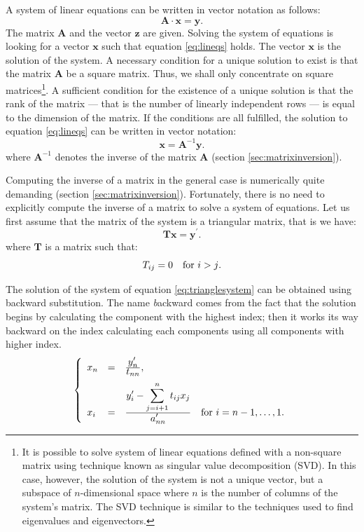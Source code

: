 A system of linear equations can be written in
vector notation as follows:
\begin{equation}
\label{eq:lineqs}
  \textbf{A}\cdot\textbf{x}=\textbf{y}.
\end{equation}
The matrix $\textbf{A}$ and the vector $\textbf{z}$ are given. Solving
the system of equations is looking for a vector $\textbf{x}$ such
that equation \ref{eq:lineqs} holds. The vector $\textbf{x}$ is the
solution of the system. A necessary condition for a unique
solution to exist is that the matrix $\textbf{A}$ be a square matrix.
Thus, we shall only concentrate on square matrices\footnote{It is
possible to solve system of linear equations defined with a
non-square matrix using technique known as singular value
decomposition (SVD). In this case, however, the solution of the
system is not a unique vector, but a subspace of $n$-dimensional
space where $n$ is the number of columns of the system's matrix.
The SVD technique is similar to the techniques used to find
eigenvalues and eigenvectors.}. A sufficient condition for the
existence of a unique solution is that the rank of the matrix
--- that is the number of linearly independent rows
--- is equal to the dimension of the matrix.
If the conditions are all fulfilled, the solution to equation
\ref{eq:lineqs} can be written in vector notation:
\begin{equation}
  \textbf{x}=\textbf{A}^{-1}\textbf{y}.
\end{equation}
where $\textbf{A}^{-1}$ denotes the inverse of the matrix $\textbf{A}$
(\cf section \ref{sec:matrixinversion}).

Computing the inverse of a matrix in the general case is
numerically quite demanding (\cf section
\ref{sec:matrixinversion}). Fortunately, there is no need to
explicitly compute the inverse of a matrix to solve a system of
equations. Let us first assume that the matrix of the system is a
triangular matrix, that is we have:
\begin{equation}
\label{eq:trianglesystem}
  \textbf{T}\textbf{x}=\textbf{y}^{\prime}.
\end{equation}
where $\textbf{T}$ is a matrix such that:
\begin{equation}
  T_{ij}=0 \mbox{\quad for $i>j$}.
\end{equation}

 The solution of the system of
equation \ref{eq:trianglesystem} can be obtained using backward
substitution. The name {\textsl backward} comes from the fact that the
solution begins by calculating the component with the highest
index; then it works its way backward on the index calculating
each components using all components with higher index.
\begin{equation}
  \left\{
  \begin{array}{lcl}
    x_n & = & {\displaystyle y_n^{\prime} \over\displaystyle t_{nn}},
    \\*[2 ex]
    x_i & = & {\displaystyle y_i^{\prime} - \sum_{j=i+1}^n t_{ij}x_j
     \over\displaystyle a_{nn}^{\prime}} \mbox{\quad for
     $i=n-1,\ldots,1$}.
  \end{array}
  \right.
\end{equation}

